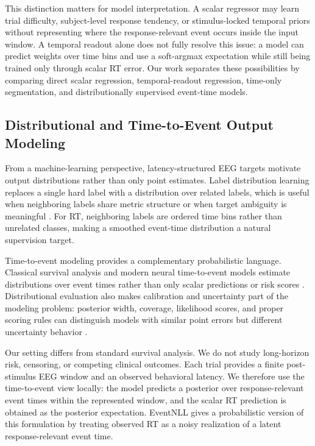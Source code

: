 \documentclass[12pt]{article}
\begin{document}
This distinction matters for model interpretation. A scalar regressor may learn trial difficulty, subject-level response tendency, or stimulus-locked temporal priors without representing where the response-relevant event occurs inside the input window. A temporal readout alone does not fully resolve this issue: a model can predict weights over time bins and use a soft-argmax expectation while still being trained only through scalar RT error. Our work separates these possibilities by comparing direct scalar regression, temporal-readout regression, time-only segmentation, and distributionally supervised event-time models.

\subsection{Distributional and Time-to-Event Output Modeling}
From a machine-learning perspective, latency-structured EEG targets motivate output distributions rather than only point estimates. Label distribution learning replaces a single hard label with a distribution over related labels, which is useful when neighboring labels share metric structure or when target ambiguity is meaningful \citep{Geng2016LabelDistributionLearning}. For RT, neighboring labels are ordered time bins rather than unrelated classes, making a smoothed event-time distribution a natural supervision target.

Time-to-event modeling provides a complementary probabilistic language. Classical survival analysis and modern neural time-to-event models estimate distributions over event times rather than only scalar predictions or risk scores \citep{Cox1972CoxPH,Lee2018DeepHit}. Distributional evaluation also makes calibration and uncertainty part of the modeling problem: posterior width, coverage, likelihood scores, and proper scoring rules can distinguish models with similar point errors but different uncertainty behavior \citep{Chapfuwa2023Calibration,Haider2020SurvivalDistributions}.

Our setting differs from standard survival analysis. We do not study long-horizon risk, censoring, or competing clinical outcomes. Each trial provides a finite post-stimulus EEG window and an observed behavioral latency. We therefore use the time-to-event view locally: the model predicts a posterior over response-relevant event times within the represented window, and the scalar RT prediction is obtained as the posterior expectation. EventNLL gives a probabilistic version of this formulation by treating observed RT as a noisy realization of a latent response-relevant event time.
\end{document}
